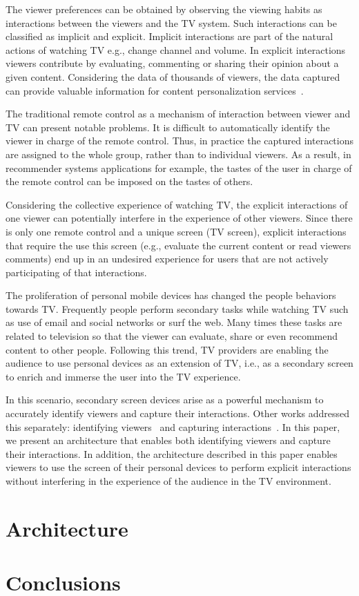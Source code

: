 \documentclass[conference,a4paper]{IEEEtran}
\begin{document}
The viewer preferences can be obtained by observing the viewing habits as interactions between the viewers and the TV system. Such interactions can be classified as implicit and explicit. Implicit interactions are part of the natural actions of watching TV e.g., change channel and volume. In explicit interactions viewers contribute by evaluating, commenting or sharing their opinion about a given content. Considering the data of thousands of viewers, the data captured can provide valuable information for content personalization services~\cite{Teixeira2010}.

The traditional remote control as a mechanism of interaction between viewer and TV can present notable problems. It is difficult to automatically identify the viewer in charge of the remote control. Thus, in practice the captured interactions are assigned to the whole group, rather than to individual viewers. As a result, in recommender systems applications for example, the tastes of the user in charge of the remote control can be imposed on the tastes of others.

Considering the collective experience of watching TV, the explicit interactions of one viewer can potentially interfere in the experience of other viewers. Since there is only one remote control and a unique screen (TV screen), explicit interactions that require the use this screen (e.g., evaluate the current content or read viewers comments) end up in an undesired experience for users that are not actively participating of that interactions.

The proliferation of personal mobile devices has changed the people behaviors towards TV. Frequently people perform secondary tasks while watching TV such as use of email and social networks or surf the web. Many times these tasks are related to television so that the viewer can evaluate, share or even recommend content to other people. Following this trend, TV providers are enabling the audience to use personal devices as an extension of TV, i.e., as a secondary screen to enrich and immerse the user into the TV experience.

In this scenario, secondary screen devices arise as a powerful mechanism to accurately identify viewers and  capture their interactions. Other works addressed this separately: identifying viewers~\cite{Cabarcos2011,Hwang2007} and capturing interactions~\cite{Teixeira2010}. In this paper, we present an architecture that enables both identifying viewers and capture their interactions. In addition, the architecture described in this paper enables viewers to use the screen of their personal devices to perform explicit interactions without interfering in the experience of the audience in the TV environment.

\section{Architecture}

\section{Conclusions}



\end{document}
